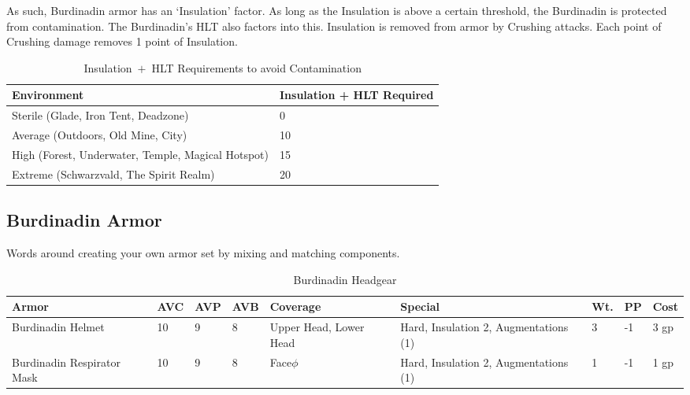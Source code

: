 \documentclass[oneside,11pt,english]{book}
\begin{document}
As such, Burdinadin armor has an ‘Insulation’ factor. As long as the Insulation
is above a certain threshold, the Burdinadin is protected from contamination.
The Burdinadin’s HLT also factors into this. Insulation is removed from armor by
Crushing attacks. Each point of Crushing damage removes 1 point of Insulation.

\begin{table}
  \centering
  \caption{Insulation~$+$~HLT Requirements to avoid Contamination}
  \label{tab:Insulation Requirements}
  \begin{tabu} spread 0pt {XX[-1]}
    Environment&Insulation + HLT Required\\\toprule
    Sterile (Glade, Iron Tent, Deadzone)&0\\
    Average (Outdoors, Old Mine, City)&10\\
    High (Forest, Underwater, Temple, Magical Hotspot)&15 \\
    Extreme (Schwarzvald, The Spirit Realm)& 20\\
  \end{tabu}
\end{table}
\subsection{Burdinadin Armor}
Words around creating your own armor set by mixing and matching components.

\begin{table}[!ht]
  \caption{Burdinadin Headgear}
  \label{tab:Burdinadin Headgear}
  \begin{tabu} to 
    Armor &AVC &AVP &AVB &Coverage &Special &Wt. &PP &Cost\\\toprule
    Burdinadin Helmet&10&9&8&Upper Head, Lower Head&Hard, Insulation 2, Augmentations (1)&3&-1&3 gp\\
    Burdinadin Respirator Mask &10 &9 &8 &Face$\phi$ &Hard, Insulation 2, Augmentations (1)&1&-1&1 gp\\
  \end{tabu}
\end{table}
\end{document}

